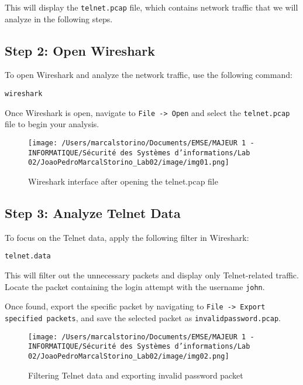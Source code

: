 \documentclass[a4paper,12pt]{article} %
\begin{document}
This will display the \texttt{telnet.pcap} file, which contains network traffic that we will analyze in the following steps.

\subsection*{Step 2: Open Wireshark}
To open Wireshark and analyze the network traffic, use the following command:

\begin{verbatim}
wireshark
\end{verbatim}

Once Wireshark is open, navigate to \texttt{File -> Open} and select the \texttt{telnet.pcap} file to begin your analysis.

\begin{figure}[h!]
\centering
\texttt{[image: /Users/marcalstorino/Documents/EMSE/MAJEUR 1 - INFORMATIQUE/Sécurité des Systèmes d'informations/Lab 02/JoaoPedroMarcalStorino\_Lab02/image/img01.png]} %
\caption{Wireshark interface after opening the telnet.pcap file}
\end{figure}

\subsection*{Step 3: Analyze Telnet Data}
To focus on the Telnet data, apply the following filter in Wireshark:

\begin{verbatim}
telnet.data
\end{verbatim}

This will filter out the unnecessary packets and display only Telnet-related traffic. Locate the packet containing the login attempt with the username \texttt{john}.

Once found, export the specific packet by navigating to \texttt{File -> Export specified packets}, and save the selected packet as \texttt{invalidpassword.pcap}.

\begin{figure}[h!]
\centering
\texttt{[image: /Users/marcalstorino/Documents/EMSE/MAJEUR 1 - INFORMATIQUE/Sécurité des Systèmes d'informations/Lab 02/JoaoPedroMarcalStorino\_Lab02/image/img02.png]} %
\caption{Filtering Telnet data and exporting invalid password packet}
\end{figure}
\end{document}
